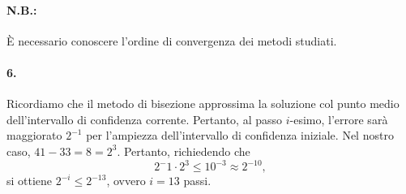 \paragraph{N.B.:} È necessario conoscere l'ordine di convergenza dei metodi studiati.

\paragraph{6. } Ricordiamo che il metodo di bisezione approssima la soluzione col punto medio dell'intervallo di confidenza corrente. Pertanto, al passo $i$-esimo, l'errore sarà maggiorato $2^{-1}$ per l'ampiezza dell'intervallo di confidenza iniziale. Nel nostro caso, $41-33=8=2^3$. Pertanto, richiedendo che
\begin{equation*}
	2^-1\cdot 2^3\leq 10^{-3}\approx 2^{-10},
\end{equation*}
si ottiene $2^{-i}\leq 2^{-13}$, ovvero $i=13$ passi.

